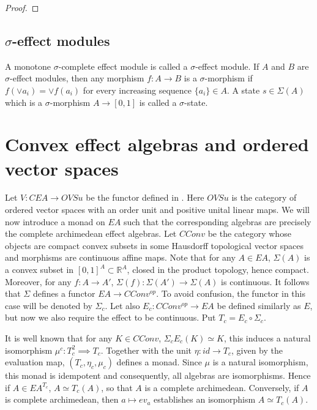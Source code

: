 \documentclass[12pt]{article}
\newcommand{\<}{\langle}
\begin{document}
\begin{proof}

\end{proof}


\subsection{$\sigma$-effect modules}

A monotone $\sigma$-complete effect module is called a $\sigma$-effect module. If $A$ and $B$ are $\sigma$-effect modules, then 
 any morphism $f:A\to B$ is a $\sigma$-morphism if $f(\vee a_i)=\vee f(a_i)$ for every increasing sequence $\{a_i\}\in A$. A state
 $s\in \Sigma(A)$ which is a $\sigma$-morphism $A\to [0,1]$ is called a $\sigma$-state.





\section{Convex effect algebras and ordered vector spaces}

Let $V: CEA\to OVSu$ be the functor defined in \cite{sylviaetc}. Here $OVSu$ is the category of ordered vector spaces with an order unit and positive unital linear maps. 
We will now introduce a monad on $EA$ such that the corresponding algebras are precisely the complete archimedean effect algebras. Let $CConv$ be the category whose objects are compact convex subsets in some Hausdorff topological vector spaces
 and morphisms are continuous affine maps. Note that for any $A\in EA$, $\Sigma(A)$ is a convex subset in $[0,1]^A\subset \mathbb R^A$, closed in the product topology, hence compact. Moreover, for any $f:A\to A'$, $\Sigma(f):\Sigma(A')\to \Sigma(A)$ is continuous. It follows that $\Sigma$ defines a functor $EA\to  CConv^{op}$. To avoid confusion, the functor in this case will be denoted by $\Sigma_c$. Let also $E_c:CConv^{op}\to EA$ be defined similarly as $E$, but now we also require the effect to be continuous. Put $T_c=E_c\circ\Sigma_c$.


It is well known that for any $K\in CConv$, $\Sigma_cE_c(K)\simeq K$, this induces a natural isomorphism $\mu^c:T_c^2\implies T_c$. Together with the unit $\eta: id\to T_c$, given by the evaluation map, $(T_c,\eta_c,\mu_c)$ defines a monad. Since $\mu$ is a natural isomorphism, this monad is idempotent and consequently, all algebras are isomorphisms. Hence if
$A\in EA^{T_c}$, $A\simeq T_c(A)$, so that $A$ is a complete archimedean. Conversely, if $A$ is complete archimedean, 
 then $a\mapsto ev_a$ establishes an isomorphism $A\simeq T_c(A)$. 
\end{document}
